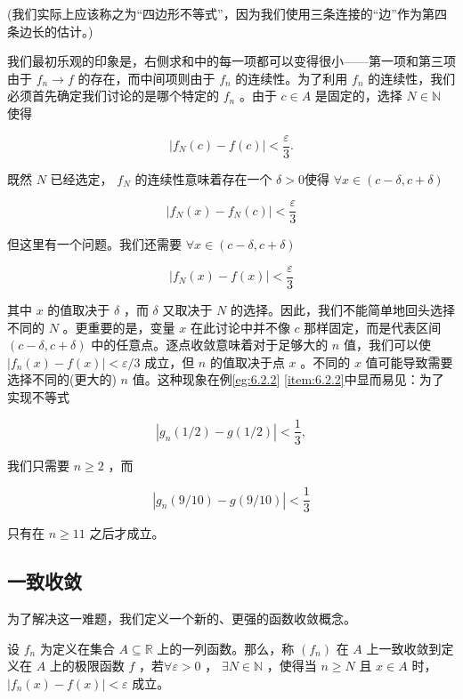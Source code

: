 (我们实际上应该称之为“四边形不等式”，因为我们使用三条连接的“边”作为第四条边长的估计。)

我们最初乐观的印象是，右侧求和中的每一项都可以变得很小——第一项和第三项由于 \({f}_{n} \rightarrow  f\) 的存在，而中间项则由于 \({f}_{n}\) 的连续性。为了利用 \({f}_{n}\) 的连续性，我们必须首先确定我们讨论的是哪个特定的 \({f}_{n}\) 。由于 \(c \in  A\) 是固定的，选择 \(N \in  \mathbb{N}\) 使得

\[
\left| {{f}_{N}\left( c\right)  - f\left( c\right) }\right|  < \frac{\varepsilon }{3}.
\]

既然 \(N\) 已经选定， \({f}_{N}\) 的连续性意味着存在一个 \(\delta  > 0\)使得 $\forall x\in (c-\delta, c+\delta)$

\[
\left| {{f}_{N}\left( x\right)  - {f}_{N}\left( c\right) }\right|  < \frac{\varepsilon }{3}
\]

但这里有一个问题。我们还需要 $\forall x\in (c-\delta, c+\delta)$

\[
\left| {{f}_{N}\left( x\right)  - f\left( x\right) }\right|  < \frac{\varepsilon }{3}
\]

其中 \(x\) 的值取决于 \(\delta\) ，而 \(\delta\) 又取决于 \(N\) 的选择。因此，我们不能简单地回头选择不同的 \(N\) 。更重要的是，变量 \(x\) 在此讨论中并不像 \(c\) 那样固定，而是代表区间 \(\left( {c - \delta ,c + \delta }\right)\) 中的任意点。逐点收敛意味着对于足够大的 \(n\) 值，我们可以使 \(\left| {{f}_{n}\left( x\right)  - f\left( x\right) }\right|  < \varepsilon /3\) 成立，但 \(n\) 的值取决于点 \(x\) 。不同的 \(x\) 值可能导致需要选择不同的(更大的) \(n\) 值。这种现象在例\ref{eg:6.2.2} \ref{item:6.2.2}中显而易见：为了实现不等式

\[
\left| {{g}_{n}\left( {1/2}\right)  - g\left( {1/2}\right) }\right|  < \frac{1}{3},
\]

我们只需要 \(n \geq  2\) ，而

\[
\left| {{g}_{n}\left( {9/{10}}\right)  - g\left( {9/{10}}\right) }\right|  < \frac{1}{3}
\]

只有在 \(n \geq  {11}\) 之后才成立。

\subsection{一致收敛}

为了解决这一难题，我们定义一个新的、更强的函数收敛概念。

\begin{Def}\label{def:6.2.3}
  设 \({f}_{n}\) 为定义在集合 \(A \subseteq  \mathbb{R}\) 上的一列函数。那么，称 \(\left( {f}_{n}\right)\) 在 \(A\) 上一致收敛到定义在 \(A\) 上的极限函数 \(f\) ，若\(\forall \varepsilon  > 0\) ， \(\exists N \in  \mathbb{N}\) ，使得当 \(n \geq  N\) 且 \(x \in  A\) 时， \(\left| {{f}_{n}\left( x\right)  - f\left( x\right) }\right|  < \varepsilon\) 成立。
\end{Def}

